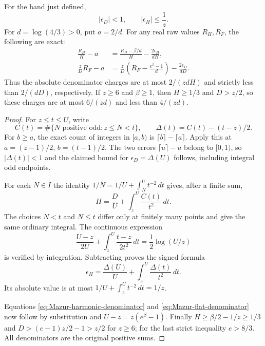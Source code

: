 \begin{proposition}
\label{prop:Mazur-band-denominators}
For the band just defined,
\begin{equation}
 |\epsilon_D|<1,\qquad |\epsilon_H|\le\frac1z.
 \label{eq:Mazur-band-denominators}
\end{equation}
For $d=\log(4/3)>0$, put $a=2/d$.
For any real raw values $R_H,R_F$, the following are exact:
\begin{align}
 \frac{R_H}{H}-a
 &=\frac{R_H-\beta/d}{H}-\frac{2\epsilon_H}{dH},
 \label{eq:Mazur-harmonic-denominator}\\
 \frac zD R_F-a
 &=\frac zD\left(R_F-\frac{e^\beta-1}{d}\right)
       -\frac{2\epsilon_D}{dD}.
 \label{eq:Mazur-flat-denominator}
\end{align}
Thus the absolute denominator charges are at most
$2/(zdH)$ and strictly less than $2/(dD)$, respectively.
If $z\ge6$ and $\beta\ge1$, then $H\ge1/3$ and $D>z/2$,
so these charges are at most $6/(zd)$ and less than $4/(zd)$.
\end{proposition}
\begin{proof}
For $z\le t\le U$, write
\[
 C(t)=\#\{N\text{ positive odd}:z\le N<t\},\qquad
 \Delta(t)=C(t)-(t-z)/2 .
\]
For $b\ge a$, the exact count of integers in $[a,b)$ is
$\lceil b\rceil-\lceil a\rceil$.
Apply this at $a=(z-1)/2$, $b=(t-1)/2$.
The two errors $\lceil u\rceil-u$ belong to $[0,1)$,
so $|\Delta(t)|<1$ and the claimed bound for $\epsilon_D=\Delta(U)$
follows, including integral odd endpoints.

For each $N\in I$ the identity
$1/N=1/U+\int_N^U t^{-2}\,dt$ gives, after a finite sum,
\[
 H=\frac D U+\int_z^U\frac{C(t)}{t^2}\,dt.
\]
The choices $N<t$ and $N\le t$ differ only at finitely many points
and give the same ordinary integral. The continuous expression
\[
 \frac{U-z}{2U}+
 \int_z^U\frac{t-z}{2t^2}\,dt=\frac12\log(U/z)
\]
is verified by integration. Subtracting proves the signed formula
\[
 \epsilon_H=\frac{\Delta(U)}U+
                      \int_z^U\frac{\Delta(t)}{t^2}\,dt .
\]
Its absolute value is at most
$1/U+\int_z^Ut^{-2}\,dt=1/z$.

Equations \eqref{eq:Mazur-harmonic-denominator} and
\eqref{eq:Mazur-flat-denominator} now follow by substitution and
$U-z=z(e^\beta-1)$. Finally
$H\ge\beta/2-1/z\ge1/3$ and
$D>(e-1)z/2-1>z/2$ for $z\ge6$; for the last strict inequality
$e>8/3$. All denominators are the original positive sums.
\end{proof}

